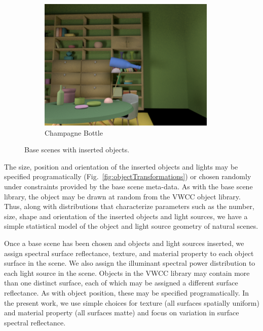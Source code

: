 \documentclass{jov}
\begin{document}
\begin{figure}[h]
\begin{subfigure}[b]{0.22 \textwidth}
        \includegraphics[width=\textwidth]{../Figures/Figure10/Figure10_f.png}
        \caption{Champagne Bottle}
        \label{fig:libraryWithChampagneBottle}
    \end{subfigure}
\caption{Base scenes with inserted objects.}\label{fig:libraryWithTarget}
\end{figure}

The size, position and orientation of the inserted objects and lights may be specified programatically (Fig.~\ref{fig:objectTransformations}) or chosen randomly under constraints provided by the base scene meta-data. As with the base scene library, the object may be drawn at random from the VWCC object library.  Thus, along with distributions that characterize parameters such as the number, size, shape and orientation of the inserted objects and light sources, we have a simple statistical model of the object and light source geometry of natural scenes. 

Once a base scene has been chosen and objects and light sources inserted, we assign spectral surface reflectance, texture, and material property to each object surface in the scene. We also assign the illuminant spectral power distribution to each light source in the scene. Objects in the VWCC library may contain more than one distinct surface, each of which may be assigned a different surface reflectance. As with object position, these may be specified programatically. In the present work, we use simple choices for texture (all surfaces spatially uniform) and material property (all surfaces matte) and focus on variation in surface spectral reflectance. 
\end{document}
